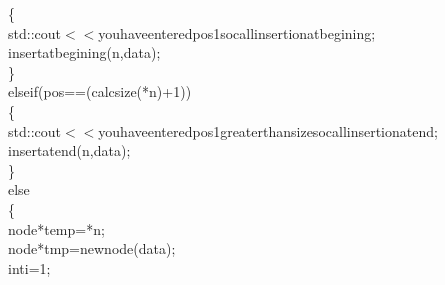 \documentclass[a4paper, 9pt]{article}
\newcommand\SPC{\hspace*{0.6em}}
\newcommand\TAB{\hspace*{1.2em}}
\newcommand\QOT{\mbox{\char 34}}
\newcommand{\CppAIdentifier}[1]{\textcolor[rgb]{0.88,0.89,0.89}{#1}}
\newcommand{\CppANumber}[1]{\textcolor[rgb]{1,0.8,0.13}{#1}}
\newcommand{\CppAReservedWord}[1]{\textcolor[rgb]{0.4,0.55,0.69}{#1}}
\newcommand{\CppASpace}[1]{\colorbox[rgb]{0.16,0.19,0.2}{#1}}
\newcommand{\CppAString}[1]{\textcolor[rgb]{0.93,0.46,0}{#1}}
\newcommand{\CppASymbol}[1]{\textcolor[rgb]{0.91,0.89,0.72}{#1}}
\begin{document}
\begin{ttfamily}
\CppASpace{\TAB \TAB \TAB \TAB }\CppASymbol{\{}\\
\CppASpace{\TAB \TAB \TAB \TAB \TAB }\CppAIdentifier{std}\CppASymbol{::}\CppAIdentifier{cout}\CppASymbol{$<$$<$}\CppAString{\QOT you\SPC have\SPC entered\SPC pos\SPC 1\SPC so\SPC call\SPC insertion\SPC at\SPC begining\QOT }\CppASymbol{;}\\
\CppASpace{\TAB \TAB \TAB \TAB \TAB }\CppAIdentifier{insertatbegining}\CppASymbol{(}\CppAIdentifier{n}\CppASymbol{,}\CppAIdentifier{data}\CppASymbol{)}\CppASymbol{;}\\
\CppASpace{\TAB \TAB \TAB }\CppASymbol{\}}\\
\CppASpace{\TAB \TAB \SPC \TAB }\CppAReservedWord{else}\CppASpace{\SPC }\CppAReservedWord{if}\CppASymbol{(}\CppAIdentifier{pos}\CppASymbol{==}\CppASymbol{(}\CppAIdentifier{calcsize}\CppASymbol{(}\CppASymbol{*}\CppAIdentifier{n}\CppASymbol{)}\CppASymbol{+}\CppANumber{1}\CppASymbol{)}\CppASymbol{)}\\
\CppASpace{\TAB \TAB \TAB \TAB }\CppASymbol{\{}\\
\CppASpace{\TAB \TAB \TAB \TAB \SPC \SPC \SPC \SPC }\CppAIdentifier{std}\CppASymbol{::}\CppAIdentifier{cout}\CppASymbol{$<$$<$}\CppAString{\QOT you\SPC have\SPC entered\SPC pos\SPC 1\SPC greater\SPC than\SPC size\SPC so\SPC call\SPC insertion\SPC at\SPC end\QOT }\CppASymbol{;}\\
\CppASpace{\TAB \TAB \TAB \TAB \TAB }\CppAIdentifier{insertatend}\CppASymbol{(}\CppAIdentifier{n}\CppASymbol{,}\CppAIdentifier{data}\CppASymbol{)}\CppASymbol{;}\\
\CppASpace{\TAB \TAB \TAB \TAB }\CppASymbol{\}}\\
\CppASpace{\TAB \TAB \TAB }\CppAReservedWord{else}\\
\CppASpace{\TAB \TAB \TAB }\CppASymbol{\{}\\
\CppASpace{\TAB \TAB \TAB \TAB }\CppAIdentifier{node}\CppASpace{\SPC }\CppASymbol{*}\CppAIdentifier{temp}\CppASpace{\SPC }\CppASymbol{=}\CppASpace{\SPC }\CppASymbol{*}\CppAIdentifier{n}\CppASymbol{;}\\
\CppASpace{\TAB \TAB \TAB \TAB }\CppAIdentifier{node}\CppASymbol{*}\CppASpace{\SPC }\CppAIdentifier{tmp}\CppASpace{\SPC }\CppASymbol{=}\CppASpace{\SPC }\CppAReservedWord{new}\CppASpace{\SPC }\CppAIdentifier{node}\CppASymbol{(}\CppAIdentifier{data}\CppASymbol{)}\CppASymbol{;}\\
\CppASpace{\TAB \TAB \TAB \TAB }\CppAReservedWord{int}\CppASpace{\SPC }\CppAIdentifier{i}\CppASpace{\SPC }\CppASymbol{=}\CppASpace{\SPC }\CppANumber{1}\CppASymbol{;}\\

\end{ttfamily}
\end{document}
